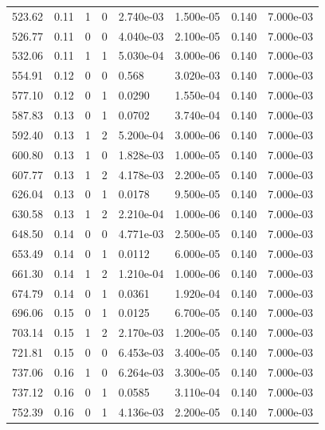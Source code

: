\documentclass[preview]{standalone}
\begin{document}
{{{\begin{tabular}{L{1.2cm}C{1.2cm} C{0.3cm}C{0.5cm} C{1.4cm}C{1.4cm} C{1.4cm}C{1.4cm}}
  523.62  &  0.11  & 1     &  0 &  2.740e-03  & 1.500e-05  & 0.140 &  7.000e-03   \\ 
  526.77  &  0.11  & 0     &  0 &  4.040e-03  & 2.100e-05  & 0.140 &  7.000e-03   \\ 
  532.06  &  0.11  & 1     &  1 &  5.030e-04  & 3.000e-06  & 0.140 &  7.000e-03   \\ 
  554.91  &  0.12  & 0     &  0 &  0.568  & 3.020e-03  & 0.140 &  7.000e-03   \\ 
  577.10  &  0.12  & 0     &  1 &  0.0290  & 1.550e-04  & 0.140 &  7.000e-03   \\ 
  587.83  &  0.13  & 0     &  1 &  0.0702  & 3.740e-04  & 0.140 &  7.000e-03   \\ 
  592.40  &  0.13  & 1     &  2 &  5.200e-04  & 3.000e-06  & 0.140 &  7.000e-03   \\ 
  600.80  &  0.13  & 1     &  0 &  1.828e-03  & 1.000e-05  & 0.140 &  7.000e-03   \\ 
  607.77  &  0.13  & 1     &  2 &  4.178e-03  & 2.200e-05  & 0.140 &  7.000e-03   \\ 
  626.04  &  0.13  & 0     &  1 &  0.0178  & 9.500e-05  & 0.140 &  7.000e-03   \\ 
  630.58  &  0.13  & 1     &  2 &  2.210e-04  & 1.000e-06  & 0.140 &  7.000e-03   \\ 
  648.50  &  0.14  & 0     &  0 &  4.771e-03  & 2.500e-05  & 0.140 &  7.000e-03   \\ 
  653.49  &  0.14  & 0     &  1 &  0.0112  & 6.000e-05  & 0.140 &  7.000e-03   \\ 
  661.30  &  0.14  & 1     &  2 &  1.210e-04  & 1.000e-06  & 0.140 &  7.000e-03   \\ 
  674.79  &  0.14  & 0     &  1 &  0.0361  & 1.920e-04  & 0.140 &  7.000e-03   \\ 
  696.06  &  0.15  & 0     &  1 &  0.0125  & 6.700e-05  & 0.140 &  7.000e-03   \\ 
  703.14  &  0.15  & 1     &  2 &  2.170e-03  & 1.200e-05  & 0.140 &  7.000e-03   \\ 
  721.81  &  0.15  & 0     &  0 &  6.453e-03  & 3.400e-05  & 0.140 &  7.000e-03   \\ 
  737.06  &  0.16  & 1     &  0 &  6.264e-03  & 3.300e-05  & 0.140 &  7.000e-03   \\ 
  737.12  &  0.16  & 0     &  1 &  0.0585  & 3.110e-04  & 0.140 &  7.000e-03   \\ 
  752.39  &  0.16  & 0     &  1 &  4.136e-03  & 2.200e-05  & 0.140 &  7.000e-03   \\ 

\end{tabular}}}}
\end{document}
